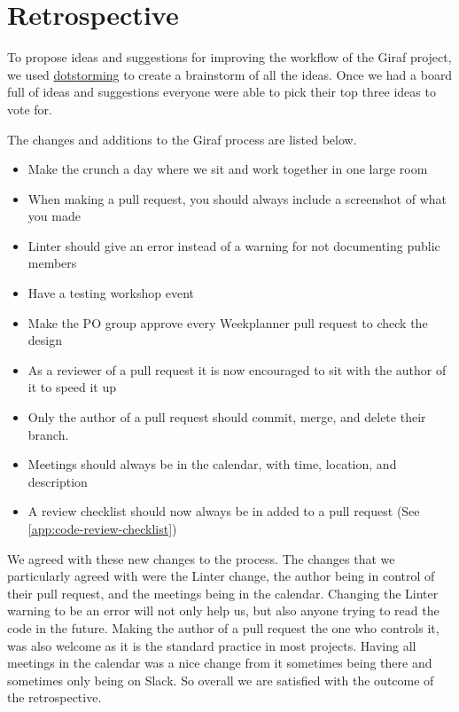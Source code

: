 \section{Retrospective}
To propose ideas and suggestions for improving the workflow of the Giraf project, we used \href{https://dotstorming.com/}{dotstorming} to create a brainstorm of all the ideas. 
Once we had a board full of ideas and suggestions everyone were able to pick their top three ideas to vote for.

The changes and additions to the Giraf process are listed below.

\begin{itemize}
  \item Make the crunch a day where we sit and work together in one large room
  \item When making a pull request, you should always include a screenshot of what you made
  \item Linter should give an error instead of a warning for not documenting public members
  \item Have a testing workshop event
  \item Make the PO group approve every Weekplanner pull request to check the design
  \item As a reviewer of a pull request it is now encouraged to sit with the author of it to speed it up
  \item Only the author of a pull request should commit, merge, and delete their branch.
  \item Meetings should always be in the calendar, with time, location, and description
  \item A review checklist should now always be in added to a pull request (See \autoref{app:code-review-checklist})
\end{itemize}

We agreed with these new changes to the process.
The changes that we particularly agreed with were the Linter change, the author being in control of their pull request, and the meetings being in the calendar.
Changing the Linter warning to be an error will not only help us, but also anyone trying to read the code in the future.
Making the author of a pull request the one who controls it, was also welcome as it is the standard practice in most projects.
Having all meetings in the calendar was a nice change from it sometimes being there and sometimes only being on Slack.
So overall we are satisfied with the outcome of the retrospective.
